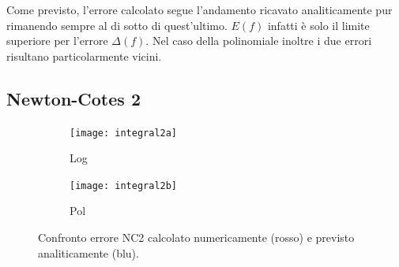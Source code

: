 Come previsto, l'errore calcolato segue l'andamento ricavato analiticamente pur rimanendo sempre al di sotto di quest'ultimo. $E(f)$ infatti è solo il limite superiore per l'errore $\Delta(f).$ Nel caso della polinomiale inoltre i due errori risultano particolarmente vicini.

\subsection{Newton-Cotes 2}

\begin{figure}[H]
 \begin{subfigure}[b]{0.5\textwidth}
  \centering
  \texttt{[image: integral2a]}
  \caption{Log}
 \end{subfigure}
 \begin{subfigure}[b]{0.5\textwidth}
  \centering
  \texttt{[image: integral2b]}
  \caption{Pol}
 \end{subfigure}
\caption{Confronto errore NC2 calcolato numericamente (rosso) e previsto analiticamente (blu).}
\label{fig:integral2}
\end{figure}

